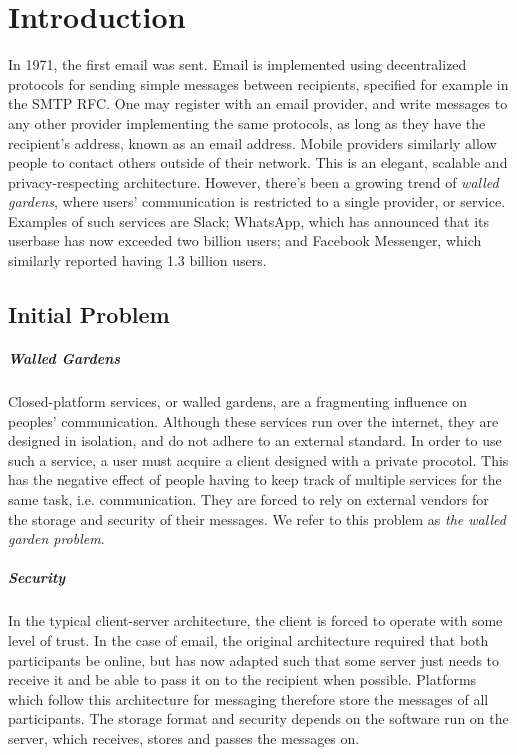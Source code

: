 \chapter{Introduction}
In 1971, the first email was sent\cite{tomlinson2009first}.
Email is implemented using decentralized protocols for sending simple messages between recipients, specified for example in the \ac{SMTP} \ac{RFC}\cite{RFC5321}.
One may register with an email provider, and write messages to any other provider implementing the same protocols, as long as they have the recipient's address, known as an email address.
Mobile providers similarly allow people to contact others outside of their network.
This is an elegant, scalable and privacy-respecting architecture.
However, there's been a growing trend of \textit{walled gardens}\cite{walled_gardens_gunnar_wolf_acm_2018}, where users' communication is restricted to a single provider, or service.
Examples of such services are Slack\cite{walled_gardens_gunnar_wolf_acm_2018}; WhatsApp, which has announced that its userbase has now exceeded two billion users\cite{whatsapp_2b_users_archive_org}; and Facebook Messenger, which similarly reported having 1.3 billion users\cite{messenger_1pt3b_users}.

\section{Initial Problem}\label{subsec:initial_problem_statement}
\paragraph{Walled Gardens}
Closed-platform services, or walled gardens, are a fragmenting influence on peoples' communication.
Although these services run over the internet, they are designed in isolation, and do not adhere to an external standard.
In order to use such a service, a user must acquire a client designed with a private procotol.
This has the negative effect of people having to keep track of multiple services for the same task, i.e. communication.
They are forced to rely on external vendors for the storage and security of their messages.
We refer to this problem as \textit{the walled garden problem}.

\paragraph{Security}

In the typical client-server architecture, the client is forced to operate with some level of trust.
In the case of email, the original architecture required that both participants be online, but has now adapted such that some server just needs to receive it and be able to pass it on to the recipient when possible\cite{tomlinson2009first}.
Platforms which follow this architecture for messaging therefore store the messages of all participants.
The storage format and security depends on the software run on the server, which receives, stores and passes the messages on.

